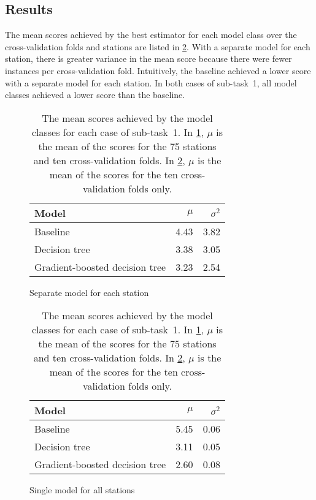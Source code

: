 \documentclass[11pt]{extarticle}
\begin{document}
\subsection{Results}

The mean scores achieved by the best estimator for each model class over the
cross-validation folds and stations are listed in \cref{tab:chart-subtask-1}.
With a separate model for each station, there is greater variance in the mean score
because there were fewer instances per cross-validation fold.
Intuitively, the baseline achieved a lower score with a separate model for each
station.
In both cases of sub-task~1, all model classes achieved a lower score than the
baseline.

\begin{table}
  \centering
  \begin{subfigure}{0.49\textwidth}
    \centering
    \begin{tabular}{lrr}
      \toprule
      Model                          & $\mu$ & $\sigma^2$
      \\
      \midrule
      Baseline                       & 4.43  & 3.82
      \\
      Decision tree                  & 3.38  & 3.05
      \\
      Gradient-boosted decision tree & 3.23  & 2.54
      \\
      \bottomrule
    \end{tabular}
    \caption{Separate model for each station}
    \label{tab:chart-subtask-1-1}
  \end{subfigure}
  \begin{subfigure}{0.49\textwidth}
    \centering
    \begin{tabular}{lrr}
      \toprule
      Model                          & $\mu$ & $\sigma^2$
      \\
      \midrule
      Baseline                       & 5.45  & 0.06
      \\
      Decision tree                  & 3.11  & 0.05
      \\
      Gradient-boosted decision tree & 2.60  & 0.08
      \\
      \bottomrule
    \end{tabular}
    \caption{Single model for all stations}
    \label{tab:chart-subtask-1-2}
  \end{subfigure}
  \caption{The mean scores achieved by the model classes for each case of sub-task~1.
    In \cref{tab:chart-subtask-1-1}, $\mu$ is the mean of the scores for the 75 stations
    and ten cross-validation folds.
    In \cref{tab:chart-subtask-1-2}, $\mu$ is the mean of the scores for the ten
    cross-validation folds only.
  }
  \label{tab:chart-subtask-1}
\end{table}
\end{document}

